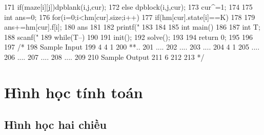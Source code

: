 \documentclass[11pt]{article}
\begin{document}
\begin{Code}
{{171              if(maze[i][j])dpblank(i,j,cur);
172              else dpblock(i,j,cur);
173              cur^=1;
174          }
175        int ans=0;
176        for(i=0;i<hm[cur].size;i++)
177          if(hm[cur].state[i]==K)
178          {
179              ans+=hm[cur].f[i];
180              ans%
181          }
182        printf("%
183
184   }
185   int main()
186   {
187       int T;
188       scanf("%
189       while(T--)
190       {
191           init();
192           solve();
193       }
194       return 0;
195   }
196
197   /*
198   Sample Input
199   4 4 1
200   **..
201   ....
202   ....
203   ....
204   4 1
205   ....
206   ....
207   ....
208   ....
209
210   Sample Output
211   6
212
213   */
\end{Code}

\section{Hình học tính toán}

\subsection{Hình học hai chiều}
\end{document}
